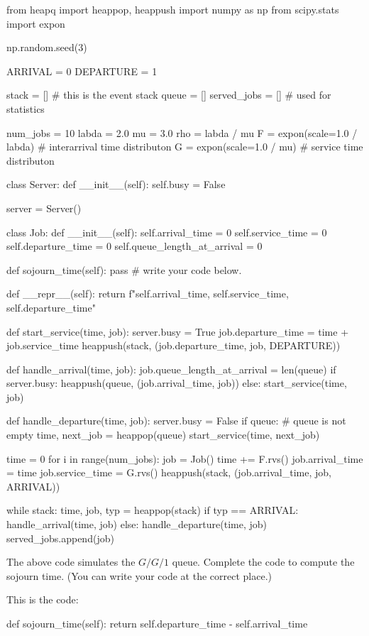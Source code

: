 \begin{pyverbatim}[stdout][numbers=left]
from heapq import heappop, heappush
import numpy as np
from scipy.stats import expon

np.random.seed(3)

ARRIVAL = 0
DEPARTURE = 1

stack = []  # this is the event stack
queue = []
served_jobs = []  # used for statistics

num_jobs = 10
labda = 2.0
mu = 3.0
rho = labda / mu
F = expon(scale=1.0 / labda)  # interarrival time distributon
G = expon(scale=1.0 / mu)  # service time distributon


class Server:
    def __init__(self):
        self.busy = False


server = Server()


class Job:
    def __init__(self):
        self.arrival_time = 0
        self.service_time = 0
        self.departure_time = 0
        self.queue_length_at_arrival = 0

    def sojourn_time(self):
       pass # write your code below.
    

    def __repr__(self):
        return f"{self.arrival_time}, {self.service_time}, {self.departure_time}\n"


def start_service(time, job):
    server.busy = True
    job.departure_time = time + job.service_time
    heappush(stack, (job.departure_time, job, DEPARTURE))


def handle_arrival(time, job):
    job.queue_length_at_arrival = len(queue)
    if server.busy:
        heappush(queue, (job.arrival_time, job))
    else:
        start_service(time, job)


def handle_departure(time, job):
    server.busy = False
    if queue:  # queue is not empty
        time, next_job = heappop(queue)
        start_service(time, next_job)


time = 0
for i in range(num_jobs):
    job = Job()
    time += F.rvs()
    job.arrival_time = time
    job.service_time = G.rvs()
    heappush(stack, (job.arrival_time, job, ARRIVAL))


while stack:
    time, job, typ = heappop(stack)
    if typ == ARRIVAL:
        handle_arrival(time, job)
    else:
        handle_departure(time, job)
        served_jobs.append(job)

\end{pyverbatim}

\begin{exercise}[201907]\label{ex:2019_2_4}
The above code simulates the $G/G/1$ queue. Complete the code to compute the sojourn time. (You can write your code at the correct place.)

\begin{solution}
  This is the code:
  \begin{pyverbatim}
    def sojourn_time(self):
       return self.departure_time - self.arrival_time

  \end{pyverbatim}
  
\end{solution}
\end{exercise}

